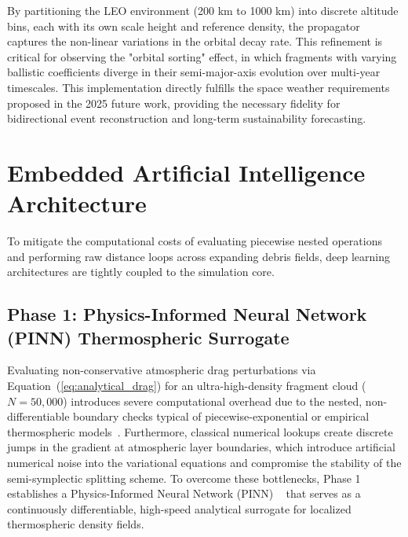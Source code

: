 \documentclass[letterpaper,11pt]{AAS}
\begin{document}
By partitioning the LEO environment (200 km to 1000 km) into discrete altitude bins, each with its own scale height and reference density, the propagator captures the non-linear variations in the orbital decay rate. This refinement is critical for observing the "orbital sorting" effect, in which fragments with varying ballistic coefficients diverge in their semi-major-axis evolution over multi-year timescales. This implementation directly fulfills the space weather requirements proposed in the 2025 future work, providing the necessary fidelity for bidirectional event reconstruction and long-term sustainability forecasting.

\section{Embedded Artificial Intelligence Architecture}
\label{sec:ai_architecture}

To mitigate the computational costs of evaluating piecewise nested operations and performing raw distance loops across expanding debris fields, deep learning architectures are tightly coupled to the simulation core.

\subsection{Phase 1: Physics-Informed Neural Network (PINN) Thermospheric Surrogate}
\label{subsec:pinn_surrogate}

Evaluating non-conservative atmospheric drag perturbations via Equation~(\ref{eq:analytical_drag}) for an ultra-high-density fragment cloud ($N = 50,000$) introduces severe computational overhead due to the nested, non-differentiable boundary checks typical of piecewise-exponential or empirical thermospheric models~\cite{puerta-ibarra_advanced_2025}. Furthermore, classical numerical lookups create discrete jumps in the gradient at atmospheric layer boundaries, which introduce artificial numerical noise into the variational equations and compromise the stability of the semi-symplectic splitting scheme. To overcome these bottlenecks, Phase 1 establishes a Physics-Informed Neural Network (PINN) ~\cite{raissi_physics-informed_2019} that serves as a continuously differentiable, high-speed analytical surrogate for localized thermospheric density fields.
\end{document}
